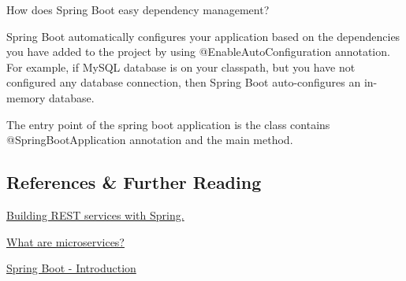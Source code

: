 \begin{quest}
\item How does Spring Boot easy dependency management?
\begin{ans}
Spring Boot automatically configures your application based on the dependencies you have added to the project by using @EnableAutoConfiguration annotation. For example, if MySQL database is on your classpath, but you have not configured any database connection, then Spring Boot auto-configures an in-memory database.

The entry point of the spring boot application is the class contains @SpringBootApplication annotation and the main method.
\end{ans}
\end{quest}





\subsection{References \& Further Reading}

\href{https://spring.io/guides/tutorials/rest/}{Building REST services with Spring.}

\href{https://microservices.io/#:~:text=Microservices%20%2D%20also%20known%20as%20the,Organized%20around%20business%20capabilities}{What are microservices?}

\href{https://www.tutorialspoint.com/spring_boot/spring_boot_introduction.htm}{Spring Boot - Introduction}
